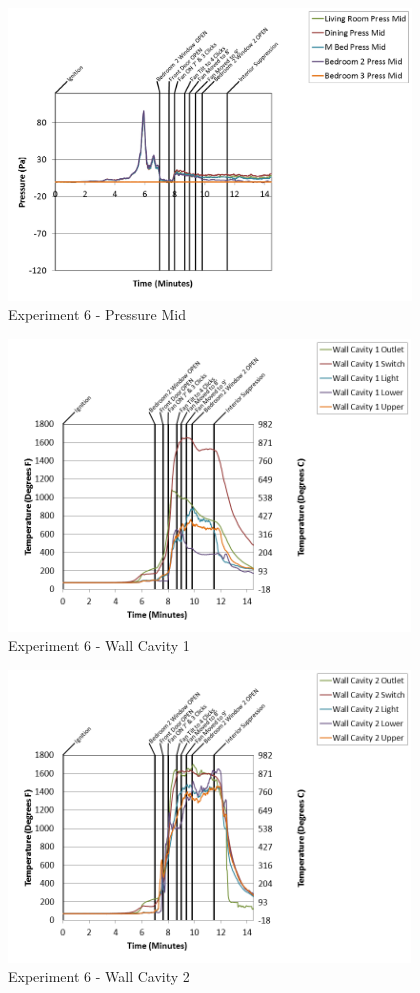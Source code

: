 \documentclass{article}
\begin{document}
\begin{appendices}
\clearpage

\begin{figure}[h!]
	\centering
	\includegraphics[height=3.05in]{0_Images/Results_Charts/Exp_6_Charts/PressureMid.png}
	\caption{Experiment 6 - Pressure Mid}
\end{figure}


\begin{figure}[h!]
	\centering
	\includegraphics[height=3.05in]{0_Images/Results_Charts/Exp_6_Charts/WallCavity1.png}
	\caption{Experiment 6 - Wall Cavity 1}
\end{figure}

\clearpage

\begin{figure}[h!]
	\centering
	\includegraphics[height=3.05in]{0_Images/Results_Charts/Exp_6_Charts/WallCavity2.png}
	\caption{Experiment 6 - Wall Cavity 2}
\end{figure}



\end{appendices}
\end{document}
